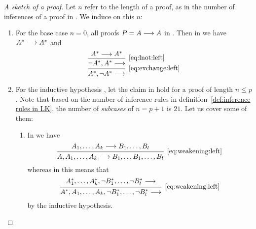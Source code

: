 \documentclass[11pt,a4paper]{article}
\begin{document}
\begin{proof}[A sketch of a proof]
    Let \(n\) refer to the length of a proof, as in the number of inferences of a proof in \LK{}.
    We induce on this \(n\):
    \begin{enumerate}
        \item
            For the base case \(n=0\), all proofs \(P = A\longrightarrow A\) in \LK{}.
            Then in \LJ{} we have \(A^\ast\longrightarrow A^\ast\) and
            \begin{equation*}
                \begin{prooftree}
                    \hypo{A^\ast\seq A^\ast}
                    \infer1[\eqref{eq:lnot:left}]{\lnot A^\ast, A^\ast\seq}
                    \infer1[\eqref{eq:exchange:left}]{A^\ast, \lnot A^\ast\seq}
                \end{prooftree}
            \end{equation*}
        \item
            For the inductive hypothesis \IH, let the claim in \LK{} hold for a proof of length \(n \leq p\).
            Note that based on the number of inference rules in definition~\ref{def:inference rules in LK},
            the number of \emph{subcases} of \(n = p+1\) is \(21\). Let us cover some of them:
            \begin{enumerate}
                \item
                    In \LK{} we have
                    \begin{equation*}
                        \begin{prooftree}
                            \hypo{A_1,\ldots,A_k\seq B_1,\ldots,B_l}
                            \infer1[\eqref{eq:weakening:left}]{A, A_1,\ldots,A_k\seq B_1,\ldots B_1,\ldots,B_l}
                        \end{prooftree}
                    \end{equation*}
                    whereas in \LJ{} this means that
                    \begin{equation*}
                        \begin{prooftree}
                            \hypo{A_1^\ast,\ldots, A_k^\ast, \lnot B_1^\ast,\ldots,\lnot B_l^\ast\seq}
                            \infer1[\eqref{eq:weakening:left}]{A^\ast, A_1,\ldots,A_k, \lnot B_1^\ast,\ldots,\lnot B_l^\ast\seq}
                        \end{prooftree}
                    \end{equation*}
                    by the inductive hypothesis.

\end{enumerate}
\end{enumerate}
\end{proof}
\end{document}
